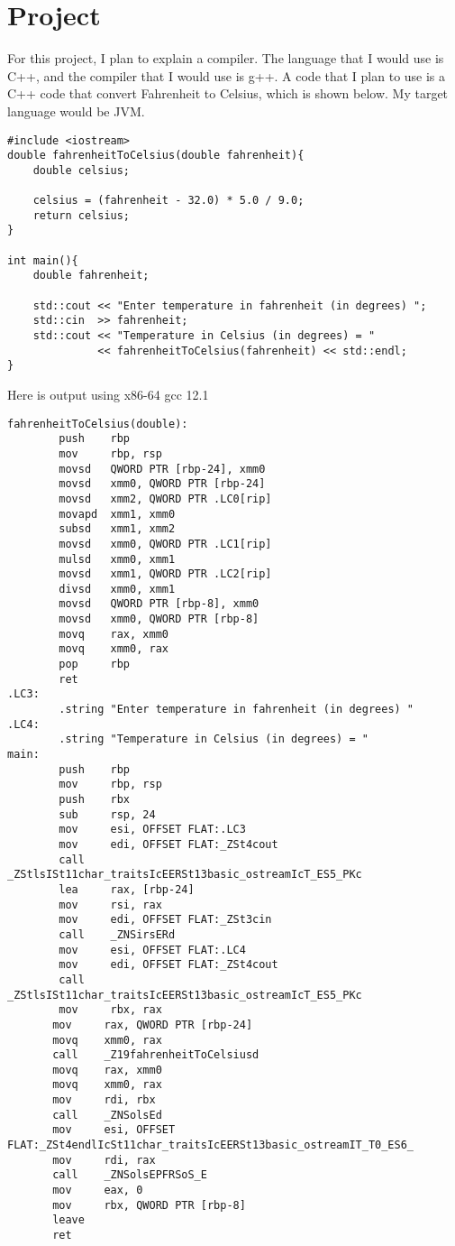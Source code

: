 \documentclass{article}
\theoremstyle{theorem}
\theoremstyle{definition}
\theoremstyle{remark}
\begin{document}
\section{Project}
For this project, I plan to explain a compiler. The language that I would use is C++, and the compiler that I would use is g++. A code that I plan to use is a C++ code that convert Fahrenheit to Celsius, which is shown below. My target language would be JVM.
\begin{lstlisting}
#include <iostream>
double fahrenheitToCelsius(double fahrenheit){
    double celsius;
 
    celsius = (fahrenheit - 32.0) * 5.0 / 9.0;
    return celsius;
}
 
int main(){
    double fahrenheit;
 
    std::cout << "Enter temperature in fahrenheit (in degrees) ";
    std::cin  >> fahrenheit;
    std::cout << "Temperature in Celsius (in degrees) = "
              << fahrenheitToCelsius(fahrenheit) << std::endl;
}
\end{lstlisting}
Here is  output using x86-64 gcc 12.1
\begin{lstlisting}
fahrenheitToCelsius(double):
        push    rbp
        mov     rbp, rsp
        movsd   QWORD PTR [rbp-24], xmm0
        movsd   xmm0, QWORD PTR [rbp-24]
        movsd   xmm2, QWORD PTR .LC0[rip]
        movapd  xmm1, xmm0
        subsd   xmm1, xmm2
        movsd   xmm0, QWORD PTR .LC1[rip]
        mulsd   xmm0, xmm1
        movsd   xmm1, QWORD PTR .LC2[rip]
        divsd   xmm0, xmm1
        movsd   QWORD PTR [rbp-8], xmm0
        movsd   xmm0, QWORD PTR [rbp-8]
        movq    rax, xmm0
        movq    xmm0, rax
        pop     rbp
        ret
.LC3:
        .string "Enter temperature in fahrenheit (in degrees) "
.LC4:
        .string "Temperature in Celsius (in degrees) = "
main:
        push    rbp
        mov     rbp, rsp
        push    rbx
        sub     rsp, 24
        mov     esi, OFFSET FLAT:.LC3
        mov     edi, OFFSET FLAT:_ZSt4cout
        call    _ZStlsISt11char_traitsIcEERSt13basic_ostreamIcT_ES5_PKc
        lea     rax, [rbp-24]
        mov     rsi, rax
        mov     edi, OFFSET FLAT:_ZSt3cin
        call    _ZNSirsERd
        mov     esi, OFFSET FLAT:.LC4
        mov     edi, OFFSET FLAT:_ZSt4cout
        call    _ZStlsISt11char_traitsIcEERSt13basic_ostreamIcT_ES5_PKc
        mov     rbx, rax
       mov     rax, QWORD PTR [rbp-24]
       movq    xmm0, rax
       call    _Z19fahrenheitToCelsiusd
       movq    rax, xmm0
       movq    xmm0, rax
       mov     rdi, rbx
       call    _ZNSolsEd
       mov     esi, OFFSET FLAT:_ZSt4endlIcSt11char_traitsIcEERSt13basic_ostreamIT_T0_ES6_
       mov     rdi, rax
       call    _ZNSolsEPFRSoS_E
       mov     eax, 0
       mov     rbx, QWORD PTR [rbp-8]
       leave
       ret
\end{lstlisting}
\end{document}
